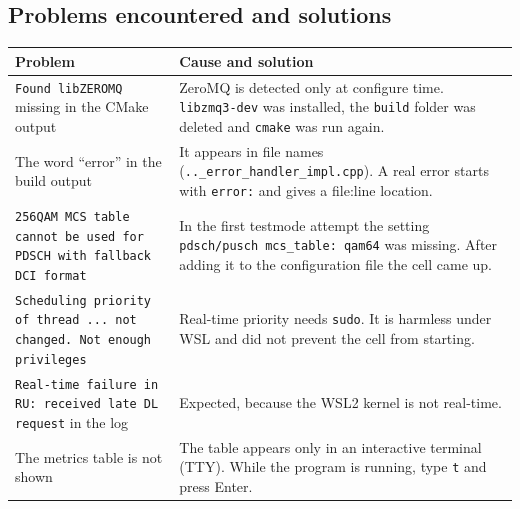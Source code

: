 \documentclass[10.5pt,a4paper]{article}
\begin{document}
\subsection{Problems encountered and solutions}
\begingroup\sffamily\small
\begin{xltabular}{\textwidth}{@{}p{4.3cm}X@{}}
\toprule
\textbf{Problem} & \textbf{Cause and solution} \\
\midrule
\texttt{Found libZEROMQ} missing in the CMake output & ZeroMQ is detected only at configure time. \texttt{libzmq3-dev} was installed, the \texttt{build} folder was deleted and \texttt{cmake} was run again. \\
The word ``error'' in the build output & It appears in file names (\texttt{..\_error\_handler\_impl.cpp}). A real error starts with \texttt{error:} and gives a file:line location. \\
\texttt{256QAM MCS table cannot be used for PDSCH with fallback DCI format} & In the first testmode attempt the setting \texttt{pdsch/pusch mcs\_table: qam64} was missing. After adding it to the configuration file the cell came up. \\
\texttt{Scheduling priority of thread ... not changed. Not enough privileges} & Real-time priority needs \texttt{sudo}. It is harmless under WSL and did not prevent the cell from starting. \\
\texttt{Real-time failure in RU: received late DL request} in the log & Expected, because the WSL2 kernel is not real-time. \\
The metrics table is not shown & The table appears only in an interactive terminal (TTY). While the program is running, type \texttt{t} and press Enter. \\
\bottomrule
\end{xltabular}
\endgroup
\end{document}
